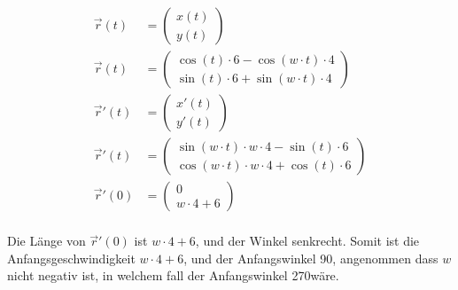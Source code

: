 \documentclass[12pt, a4paper, twoside]{article}
\begin{document}
\begin{align*}
  \overrightarrow{r}(t)  & = \begin{pmatrix}
    x(t)
    \\
    y(t)
  \end{pmatrix} \\
  \overrightarrow{r}(t)  & = \begin{pmatrix}
    \cos(t)\cdot 6 - \cos(w\cdot t)\cdot 4
    \\
    \sin(t)\cdot 6 + \sin(w\cdot t)\cdot 4
  \end{pmatrix} \\
  \overrightarrow{r}'(t) & = \begin{pmatrix}
    x'(t)
    \\
    y'(t)
  \end{pmatrix} \\
  \overrightarrow{r}'(t) & = \begin{pmatrix}
    \sin(w\cdot t)\cdot w\cdot 4 - \sin(t)\cdot 6
    \\
    \cos(w\cdot t)\cdot w\cdot 4 + \cos(t)\cdot 6
  \end{pmatrix} \\
  \overrightarrow{r}'(0) & = \begin{pmatrix}
    0
    \\
    w\cdot 4 + 6
  \end{pmatrix} \\
\end{align*}

Die Länge von $\overrightarrow{r}'(0)$ ist $w\cdot 4 + 6$, und der Winkel senkrecht.
Somit ist die Anfangsgeschwindigkeit $w\cdot 4 + 6$, und der Anfangswinkel 90\textdegree, angenommen dass $w$ nicht negativ ist, in welchem fall der Anfangswinkel 270\textdegree wäre.
\end{document}
